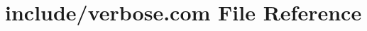 \hypertarget{home_2abonfi_2_c_f_d__codes_2_eul_f_s_83_84_2include_2verbose_8com}{\section{include/verbose.com File Reference}
\label{home_2abonfi_2_c_f_d__codes_2_eul_f_s_83_84_2include_2verbose_8com}
}
